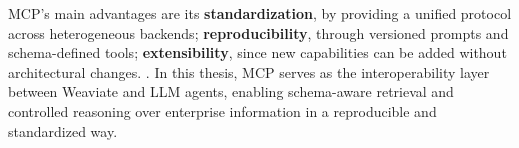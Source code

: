 MCP’s main advantages are its \textbf{standardization}, by providing a unified protocol across heterogeneous backends; \textbf{reproducibility}, through versioned prompts and schema-defined tools; \textbf{extensibility}, since new capabilities can be added without architectural changes. \cite{mcp-spec}.  
In this thesis, MCP serves as the interoperability layer between Weaviate and LLM agents, enabling schema-aware retrieval and controlled reasoning over enterprise information in a reproducible and standardized way.
